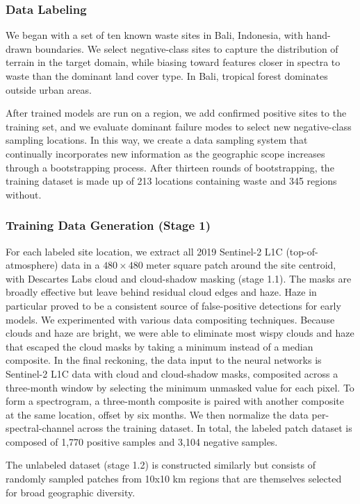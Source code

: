 \documentclass[10pt,letterpaper]{article}
\begin{document}
\subsubsection*{Data Labeling}
We began with a set of ten known waste sites in Bali, Indonesia, with hand-drawn boundaries. We select negative-class sites to capture the distribution of terrain in the target domain, while biasing toward features closer in spectra to waste than the dominant land cover type. In Bali, tropical forest dominates outside urban areas.

After trained models are run on a region, we add confirmed positive sites to the training set, and we evaluate dominant failure modes to select new negative-class sampling locations. In this way, we create a data sampling system that continually incorporates new information as the geographic scope increases through a bootstrapping process. After thirteen rounds of bootstrapping, the training dataset is made up of 213 locations containing waste and 345 regions without.

\subsubsection*{Training Data Generation (Stage 1)}
For each labeled site location, we extract all 2019 Sentinel-2 L1C (top-of-atmosphere) data in a $480\times480$ meter square patch around the site centroid, with Descartes Labs cloud and cloud-shadow masking (stage 1.1). The masks are broadly effective but leave behind residual cloud edges and haze. Haze in particular proved to be a consistent source of false-positive detections for early models. We experimented with various data compositing techniques. Because clouds and haze are bright, we were able to eliminate most wispy clouds and haze that escaped the cloud masks by taking a minimum instead of a median composite. In the final reckoning, the data input to the neural networks is Sentinel-2 L1C data with cloud and cloud-shadow masks, composited across a three-month window by selecting the minimum unmasked value for each pixel. To form a spectrogram, a three-month composite is paired with another composite at the same location, offset by six months. We then normalize the data per-spectral-channel across the training dataset. In total, the labeled patch dataset is composed of 1,770 positive samples and 3,104 negative samples.

The unlabeled dataset (stage 1.2) is constructed similarly but consists of randomly sampled patches from 10x10 km regions that are themselves selected for broad geographic diversity.
\end{document}
